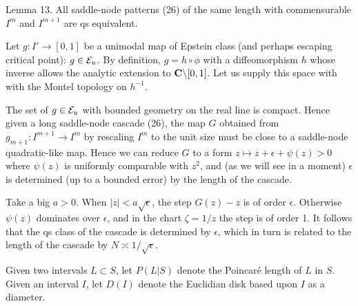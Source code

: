 

\proclaim Lemma 13. All saddle-node patterns (26) of the same length
  with commensurable 
 $I^m$ and $I^{m+1}$ are qs equivalent.

 Let 
 $g: I'\rightarrow [0,1]$ be a unimodal map
 of Epstein class (and perhaps escaping critical point): $g\in {\cal E}_u$.
 By definition, $g=h\circ\phi$ with a diffeomorphism $h$ whose 
inverse allows the analytic extension to ${\bf C}\backslash [0,1]$.
Let us supply this space with   with the Montel topology on $h^{-1}$.

The set of $g \in {\cal E}_u$ with bounded geometry on the real line
is compact. Hence given a long saddle-node cascade (26), the map $G$
obtained from 
 $g_{m+1}: I^{m+1}\rightarrow I^m$ by rescaling $I^m$
 to the unit size must be close
 to a saddle-node quadratic-like map.
Hence we can reduce $G$
to a form $z\mapsto z+\epsilon+\psi(z)>0$ where $\psi(z)$ is uniformly
comparable with $z^2$, and (as we will see in a moment)
 $\epsilon$ is determined (up to a bounded error) by the length of the
cascade.

Take a big $a>0$. When $|z|<a\sqrt\epsilon$, the step $G(z)-z$ is 
of order $\epsilon$. Otherwise $\psi(z)$ dominates over $\epsilon$,
and in the chart $\zeta=1/z$ the step is of order 1. It follows that
the qs class of the cascade is determined by $\epsilon$, which in turn 
is related to the  length of the cascade  by
$N\asymp 1/\sqrt{\epsilon}$.     \QED








Given two intervals $L\subset S$,
let $P(L|S)$ denote the Poincar\'{e}  length of $L$ in $S$. 
Given an interval $I$,
let $D(I)$ denote the Euclidian disk based upon $I$ as a diameter.


